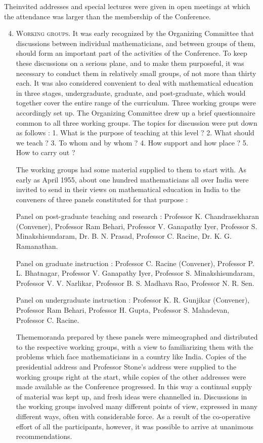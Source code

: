 The\pageoriginale invited addresses and special lectures were given in open meetings at which the attendance was larger than the membership of the Conference.
\begin{enumerate}
\setcounter{enumi}{3}
\item \textsc{Working groups.} It was early recognized by the Organizing Committee that discussions between individual mathematicians, and between groups of them, should form an important part of the activities of the Conference. To keep these discussions on a serious plane, and to make them purposeful, it was necessary to conduct them in relatively small groups, of not more than thirty each. It was also considered convenient to deal with mathematical education in three stages, undergraduate, graduate, and post-graduate, which would together cover the entire range of the curriculum. Three working groups were accordingly set up. The Organizing Committee drew up a brief questionnaire common to all three working groups. The topics for discussion were put down as follows : 1. What is the purpose of teaching at this level ? 2. What should we teach ? 3. To whom and by whom ? 4. How support and how place ? 5. How to carry out ?

The working groups had some material supplied to them to start with. As early as April 1955, about one hundred mathematicians all over India were invited to send in their views on mathematical education in India to the conveners of three panels constituted for that purpose :

Panel on post-graduate teaching and research : Professor K. Chandrasekharan (Convener), Professor Ram Behari, Professor V. Ganapathy Iyer, Professor S. Minakshisundaram, Dr. B. N. Prasad, Professor C. Racine, Dr. K. G. Ramanathan.

Panel on graduate instruction : Professor C. Racine (Convener), Professor P. L. Bhatnagar, Professor V. Ganapathy Iyer, Professor S. Minakshisundaram, Professor V. V. Narlikar, Professor B. S. Madhava Rao, Professor N. R. Sen.

Panel on undergraduate instruction : Professor K. R. Gunjikar (Convener), Professor Ram Behari, Professor H. Gupta, Professor S. Mahadevan, Professor C. Racine.

The\pageoriginale memoranda prepared by these panels were mimeographed and distributed to the respective working groups, with a view to familiarizing them with the problems which face mathematicians in a country like India. Copies of the presidential address and Professor Stone's address were supplied to the working groups right at the start, while copies of the other addresses were made available as the Conference progressed. In this way a continual supply of material was kept up, and fresh ideas were channelled in. Discussions in the working groups involved many different points of view, expressed in many different ways, often with considerable force. As a result of the co-operative effort of all the participants, however, it was possible to arrive at unanimous recommendations.


\end{enumerate}
